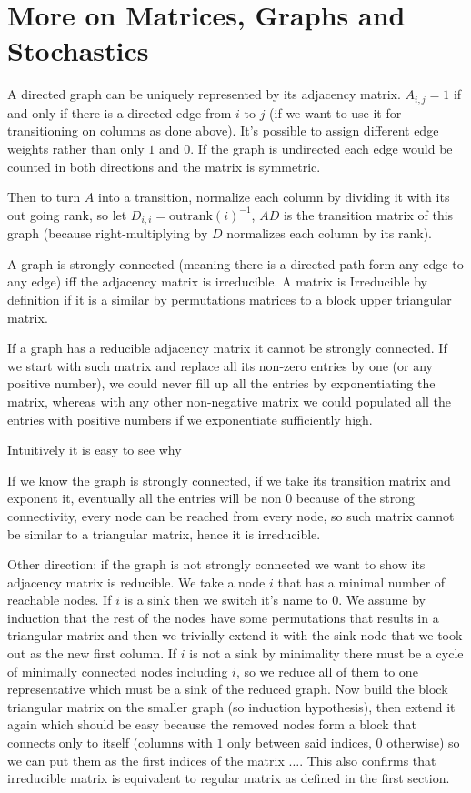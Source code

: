 \documentclass[a4paper,10pt]{article}
\theoremstyle{definition}
\theoremstyle{remark}
\theoremstyle{plain}
\begin{document}
\section{More on Matrices, Graphs and Stochastics}

A directed graph can be uniquely represented by its adjacency matrix.
$A_{i,j} = 1$ if and only if there is a directed edge from $i$ to $j$ (if we
want to use it for transitioning on columns as done above). It's possible to
assign different edge weights rather than only $1$ and $0$. If the graph is
undirected each edge would be counted in both directions and the matrix is
symmetric.

Then to turn $A$ into a transition, normalize each column by dividing it with
its out going rank, so let $D_{i,i} = \text{outrank}(i)^{-1}$, $AD$ is the
transition matrix of this graph (because right-multiplying by $D$ normalizes each
column by its rank).

A graph is strongly connected (meaning there is a directed path form any edge
to any edge) iff the adjacency matrix is irreducible. A matrix is 
Irreducible by definition if it is a
similar by permutations matrices to a block upper triangular matrix.

If a graph has a reducible adjacency matrix it cannot be strongly connected.
If we start with such matrix and replace all its non-zero entries
by one (or any positive number), we could never fill up all the entries by
exponentiating the matrix, whereas with any other non-negative matrix we could
populated all the entries with positive numbers if we exponentiate sufficiently
high.

Intuitively it is easy to see why

If we know the graph is strongly connected, 
if we take its transition matrix and exponent it, eventually all the entries
will be non $0$ because of the strong connectivity, every node can be reached
from every node, so such matrix cannot be
similar to a triangular matrix, hence it is irreducible.

Other direction: if the graph is not strongly connected we want to show its
adjacency matrix is reducible. We take a node $i$ that has a minimal number of
reachable nodes. If $i$ is a sink then we switch it's name to $0$. We assume by
induction that the rest of the nodes have some permutations that results in a
triangular matrix and then we trivially extend it with the sink node that we
took out as the new first column. If $i$ is not a sink by minimality there must
be a cycle of minimally connected nodes including $i$, so we reduce all of them
to one representative which must be a sink of the reduced graph. Now build the
block triangular matrix on the smaller graph (so induction hypothesis), then
extend it again which should be easy because the removed nodes form a block that
connects only to itself (columns with $1$ only between said indices, $0$
otherwise) so we can put them as the first indices of the matrix $\dots$.
This also confirms that irreducible matrix is equivalent to regular matrix
as defined in the first section.
\end{document}
